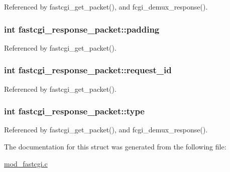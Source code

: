 Referenced by fastcgi\-\_\-get\-\_\-packet(), and fcgi\-\_\-demux\-\_\-response().

\hypertarget{structfastcgi__response__packet_a65c16422e8ed31cf27f1c0a15606e7f3}{
\subsubsection[{padding}]{\setlength{\rightskip}{0pt plus 5cm}int fastcgi\-\_\-response\-\_\-packet\-::padding}}\label{structfastcgi__response__packet_a65c16422e8ed31cf27f1c0a15606e7f3}


Referenced by fastcgi\-\_\-get\-\_\-packet().

\hypertarget{structfastcgi__response__packet_a9aa104731c6ac900bb4f26ba1489f140}{
\subsubsection[{request\-\_\-id}]{\setlength{\rightskip}{0pt plus 5cm}int fastcgi\-\_\-response\-\_\-packet\-::request\-\_\-id}}\label{structfastcgi__response__packet_a9aa104731c6ac900bb4f26ba1489f140}


Referenced by fastcgi\-\_\-get\-\_\-packet().

\hypertarget{structfastcgi__response__packet_afcc41536898c559b3e5d1a0552480b6a}{
\subsubsection[{type}]{\setlength{\rightskip}{0pt plus 5cm}int fastcgi\-\_\-response\-\_\-packet\-::type}}\label{structfastcgi__response__packet_afcc41536898c559b3e5d1a0552480b6a}


Referenced by fastcgi\-\_\-get\-\_\-packet(), and fcgi\-\_\-demux\-\_\-response().



The documentation for this struct was generated from the following file\-:\begin{DoxyCompactItemize}
\item 
\hyperlink{mod__fastcgi_8c}{mod\-\_\-fastcgi.\-c}\end{DoxyCompactItemize}
